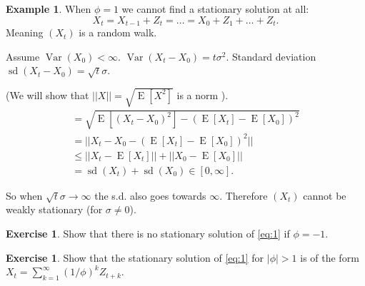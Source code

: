\documentclass[12pt,a4paper, notitlepage]{book}
\theoremstyle{definition} %
\newtheorem{example}[definition]{Example}
\newtheorem{exercise}[definition]{Exercise}
\theoremstyle{plain} %
\DeclareMathOperator{\Var}{Var}
\DeclareMathOperator{\E}{E}
\DeclareMathOperator{\Sd}{sd}
\begin{document}
\begin{example}
When $\phi = 1$ we cannot find a stationary solution at all:
\[X_t = X_{t-1} + Z_t = \dots = X_0 + Z_1 + \dots + Z_t. \]
 Meaning $(X_t)$ is a random walk. 

Assume $\Var(X_0) < \infty$. $\Var(X_t - X_0) = t \sigma^2$. 
Standard deviation $ \Sd(X_t - X_0) = \sqrt{t} \sigma$.

(We will show that $|| X || = \sqrt{ \E[X^2]}$ is a norm ).
\begin{align*} 
= \sqrt{\E \left[ (X_t - X_0)^2\right]  - \left(\E[X_t] - \E[X_0]\right)^2} \\ 
= || X_t - X_0 - (\E[X_t] - \E[X_0])^2 ||  
\\ \leq || X_t - \E [X_t]  || + || X_0 - \E[X_0]|| 
\\ =  \Sd(X_t) + \Sd(X_0) \in [0, \infty] . \end{align*}

So when $\sqrt{t}\sigma \rightarrow \infty$ the s.d. also goes towards $\infty$. Therefore $(X_t)$ cannot be weakly stationary (for $\sigma \neq 0$). 
\end{example}



\begin{exercise}
Show that there is no stationary solution of 
\ref{eq:1} 
 if $\phi = -1$.
\end{exercise}

\begin{exercise}
Show that the stationary solution of 
\ref{eq:1}  for $|\phi| > 1 $ is of the form 
$X_t = \sum_{k = 1}^\infty (1/\phi)^k Z_{t + k}$.
\end{exercise}
\end{document}
